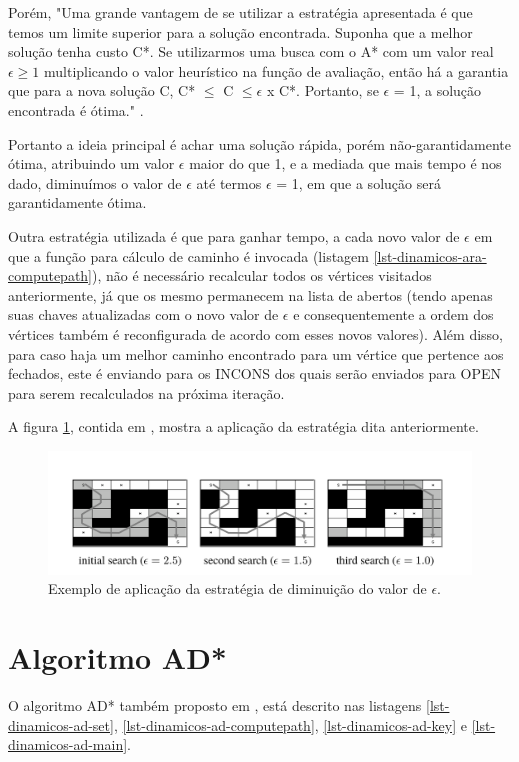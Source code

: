 Porém, "Uma grande vantagem de se utilizar a estratégia apresentada é que temos um limite superior para a solução encontrada. Suponha que a melhor solução tenha custo C*. Se utilizarmos uma busca com o A* com um valor real $\epsilon \geq 1$ multiplicando o valor heurístico na função de avaliação, então há a garantia que para a nova solução C, C* $\leq$ C $\leq \epsilon$ x C*. Portanto, se $\epsilon$ = 1, a solução encontrada é ótima." \cite{moura2010estudo}.

Portanto a ideia principal é achar uma solução rápida, porém não-garantidamente ótima, atribuindo um valor $\epsilon$ maior do que 1, e a mediada que mais tempo é nos dado, diminuímos o valor de $\epsilon$ até termos $\epsilon$ = 1, em que a solução será garantidamente ótima. 

Outra estratégia utilizada é que para ganhar tempo, a cada novo valor de $\epsilon$ em que a função para cálculo de caminho é invocada (listagem \ref{lst-dinamicos-ara-computepath}), não é necessário recalcular todos os vértices visitados anteriormente, já que os mesmo permanecem na lista de abertos (tendo apenas suas chaves atualizadas com o novo valor de $\epsilon$ e consequentemente a ordem dos vértices também é reconfigurada de acordo com esses novos valores). Além disso, para caso haja um melhor caminho encontrado para um vértice que pertence aos fechados, este é enviando para os INCONS dos quais serão enviados para OPEN para serem recalculados na próxima iteração.

A figura \ref{fig-ara-exemplo}, contida em , mostra a aplicação da estratégia dita anteriormente.

\begin{figure}[H]
\centering
\includegraphics[width=.80\textwidth]{figuras/ara-3} 
\caption{Exemplo de aplicação da estratégia de diminuição do valor de $\epsilon$.}
\label{fig-ara-exemplo}
\end{figure}
\section{Algoritmo AD*}
\label{sec-dinamicos-ad}

O algoritmo AD* também proposto em , está descrito nas listagens \ref{lst-dinamicos-ad-set}, \ref{lst-dinamicos-ad-computepath}, \ref{lst-dinamicos-ad-key} e \ref{lst-dinamicos-ad-main}.

